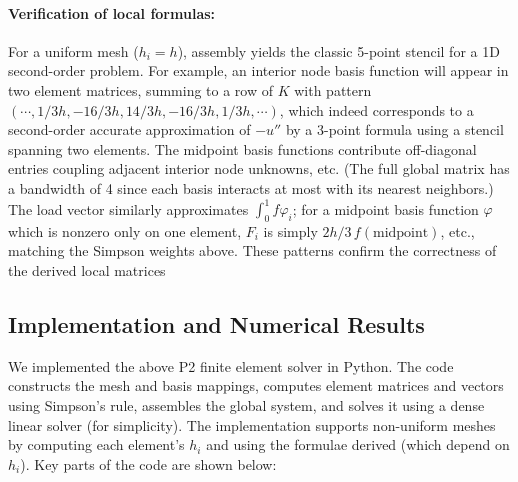 \documentclass[a4paper,10pt]{article}
\begin{document}
\paragraph{Verification of local formulas:} 
For a uniform mesh ($h_i=h$), assembly yields the classic 5-point stencil for a 1D second-order problem. 
For example, an interior node basis function will appear in two element matrices, summing to a row of $K$ with pattern $(\cdots, 1/3h, -16/3h, 14/3h, -16/3h, 1/3h,\cdots)$, which indeed corresponds to a second-order accurate approximation of $-u''$ by a 3-point formula using a stencil spanning two elements. 
The midpoint basis functions contribute off-diagonal entries coupling adjacent interior node unknowns, etc. (The full global matrix has a bandwidth of 4 since each basis interacts at most with its nearest neighbors.) 
The load vector similarly approximates $\int_0^1 f\varphi_i$; for a midpoint basis function $\varphi$ which is nonzero only on one element, $F_i$ is simply $2h/3\,f(\text{midpoint})$, etc., matching the Simpson weights above. 
These patterns confirm the correctness of the derived local matrices 

\subsection{Implementation and Numerical Results}

We implemented the above P2 finite element solver in Python. 
The code constructs the mesh and basis mappings, computes element matrices and vectors using Simpson's rule, assembles the global system, and solves it using a dense linear solver (for simplicity). 
The implementation supports non-uniform meshes by computing each element’s $h_i$ and using the formulae derived (which depend on $h_i$). 
Key parts of the code are shown below:
\end{document}
